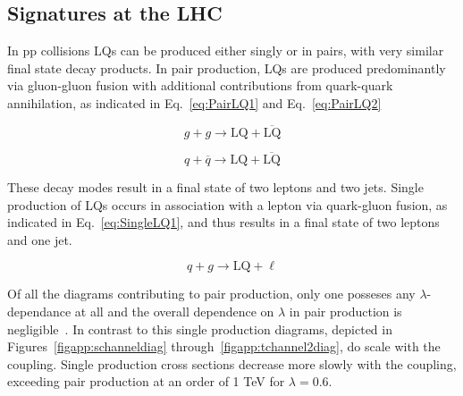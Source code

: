 \subsection{Signatures at the LHC}
In pp collisions LQs can be produced either singly or in pairs, with very similar final state decay products.  In pair production, LQs are produced predominantly via gluon-gluon fusion with additional contributions from quark-quark annihilation, as indicated in Eq.~\ref{eq:PairLQ1} and Eq.~\ref{eq:PairLQ2}


\begin{equation}
g+g\rightarrow \text{LQ}+\overline{\text{LQ}}
\label{eq:PairLQ1}
\end{equation}



\begin{equation}
q+\overline{q}\rightarrow \text{LQ}+\overline{\text{LQ}}
\label{eq:PairLQ2}
\end{equation}

These decay modes result in a final state of two leptons and two jets.  Single production of LQs occurs in association with a lepton via quark-gluon fusion, as indicated in Eq.~\ref{eq:SingleLQ1}, and thus results in a final state of two leptons and one jet.



\begin{equation}
q+g\rightarrow \text{LQ}+\ell
\label{eq:SingleLQ1}
\end{equation}

Of all the diagrams contributing to pair production, only one posseses any $\lambda$-dependance at all and the overall dependence on $\lambda$ in pair production is negligible~\cite{Hewett:1997ce}.  In contrast to this single production diagrams, depicted in Figures~\ref{figapp:schanneldiag} through~\ref{figapp:tchannel2diag}, do scale with the coupling.  Single production cross sections decrease more slowly with the coupling, exceeding pair production at an order of 1 TeV for $\lambda = 0.6$.  



